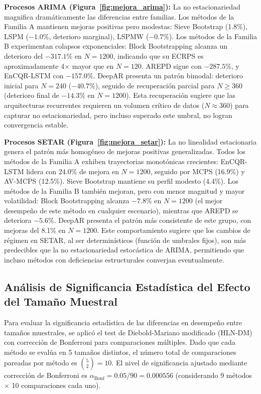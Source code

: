 \textbf{Procesos ARIMA (Figura~\ref{fig:mejora_arima}):} La no estacionariedad magnifica dramáticamente las diferencias entre familias. Los métodos de la Familia A mantienen mejoras positivas pero modestas: Sieve Bootstrap (1.8\%), LSPM ($-1.0\%$, deterioro marginal), LSPMW ($-0.7\%$). Los métodos de la Familia B experimentan colapsos exponenciales: Block Bootstrapping alcanza un deterioro del $-317.1\%$ en $N = 1200$, indicando que su ECRPS es aproximadamente 4× mayor que en $N = 120$. AREPD sigue con $-287.5\%$, y EnCQR-LSTM con $-157.0\%$. DeepAR presenta un patrón bimodal: deterioro inicial para $N = 240$ ($-40.7\%$), seguido de recuperación parcial para $N \geq 360$ (deterioro final de $-14.3\%$ en $N = 1200$). Esta recuperación sugiere que las arquitecturas recurrentes requieren un volumen crítico de datos ($N \approx 360$) para capturar no estacionariedad, pero incluso superado este umbral, no logran convergencia estable.

\textbf{Procesos SETAR (Figura~\ref{fig:mejora_setar}):} La no linealidad estacionaria genera el patrón más homogéneo de mejoras positivas generalizadas. Todos los métodos de la Familia A exhiben trayectorias monotónicas crecientes: EnCQR-LSTM lidera con 24.0\% de mejora en $N = 1200$, seguido por MCPS (16.9\%) y AV-MCPS (12.5\%). Sieve Bootstrap mantiene su perfil modesto (4.4\%). Los métodos de la Familia B también mejoran, pero con menor magnitud y mayor volatilidad: Block Bootstrapping alcanza $-7.8\%$ en $N = 1200$ (el mejor desempeño de este método en cualquier escenario), mientras que AREPD se deteriora $-5.6\%$. DeepAR presenta el patrón más consistente de este grupo, con mejoras del 8.1\% en $N = 1200$. Este comportamiento sugiere que los cambios de régimen en SETAR, al ser determinísticos (función de umbrales fijos), son más predecibles que la no estacionariedad estocástica de ARIMA, permitiendo que incluso métodos con deficiencias estructurales converjan eventualmente.
\subsection{Análisis de Significancia Estadística del Efecto del Tamaño Muestral}
\label{subsec:dm_tamano_muestral}

Para evaluar la significancia estadística de las diferencias en desempeño entre tamaños muestrales, se aplicó el test de Diebold-Mariano modificado (HLN-DM) con corrección de Bonferroni para comparaciones múltiples. Dado que cada método se evalúa en 5 tamaños distintos, el número total de comparaciones pareadas por método es $\binom{5}{2} = 10$. El nivel de significancia ajustado mediante corrección de Bonferroni es $\alpha_{\text{Bonf}} = 0.05/90 = 0.000556$ (considerando 9 métodos $\times$ 10 comparaciones cada uno).

